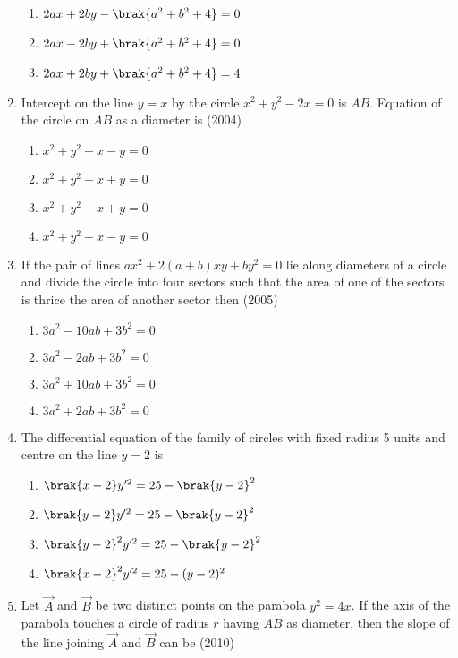 \begin{enumerate}
\begin{multicols}{2}
\begin{enumerate}
\item $2ax+2by-\brak{a^2+b^2+4}=0$
\item $2ax-2by+\brak{a^2+b^2+4}=0$
\item $2ax+2by+\brak{a^2+b^2+4}=4$
\end{enumerate}
\end{multicols}
\item Intercept on the line $y=x$ by the circle $x^2+y^2-2x=0$ is $AB$. Equation of the circle on $AB$ as a diameter is 
\hfill{(2004)}
\begin{multicols}{2}
\begin{enumerate}
\item $x^2+y^2+x-y=0$
\item $x^2+y^2-x+y=0$
\item $x^2+y^2+x+y=0$
\item $x^2+y^2-x-y=0$
\end{enumerate}
\end{multicols}
\item If the pair of lines $ax^2+2(a+b)xy+by^2=0$ lie along diameters of a circle and divide the circle into four sectors such that the area of one of the sectors is thrice the area of another sector then
\hfill{(2005)}
\begin{multicols}{2}
\begin{enumerate}
\item $3a^2-10ab+3b^2=0$
\item $3a^2-2ab+3b^2=0$
\item $3a^2+10ab+3b^2=0$
\item $3a^2+2ab+3b^2=0$
\end{enumerate}
\end{multicols}
\item The differential equation of the family of circles with fixed radius 5 units and centre on the line $y=2$ is
\begin{multicols}{2}
\begin{enumerate}
\item $\brak{x-2}y^{\prime 2}=25-\brak{y-2}^2$
\item $\brak{y-2}y^{\prime 2}=25-\brak{y-2}^2$
\item $\brak{y-2}^2y^{\prime 2}=25-\brak{y-2}^2$
\item $\brak{x-2}^2y^{\prime 2}=25-(y-2)^2$
\end{enumerate}
\end{multicols}
	\item Let $\vec{A}$ and $\vec{B}$ be two distinct points on the parabola $y^2=4x$. If
      	      the axis of the parabola touches a circle of radius $r$ having
		$AB$ as diameter, then the slope of the line joining $\vec{A}$ and $\vec{B}$
	     can be 
		\hfill(2010)
		

\end{enumerate}
